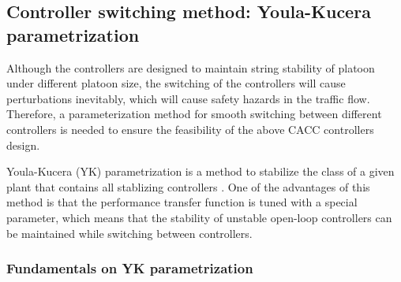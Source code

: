 \documentclass[journal]{IEEEtran}
\begin{document}


\subsection{Controller switching method: Youla-Kucera parametrization}
\label{Section 3.2}

Although the controllers are designed to maintain string stability of platoon under different platoon size, the switching of the controllers will cause perturbations inevitably, which will cause safety hazards in the traffic flow. Therefore, a parameterization method for smooth switching between different controllers is needed to ensure the feasibility of the above CACC controllers design.

Youla-Kucera (YK) parametrization is a method to stabilize the class of a given plant that contains all stablizing controllers \citep{dasgupta1996parametrization,navas2017youla}. One of the advantages of this method is that the performance transfer function is tuned with a special parameter, which means that the stability of unstable open-loop controllers can be maintained while switching between controllers.

\subsubsection{Fundamentals on YK parametrization}
\label{Section 3.2.1}
\end{document}
